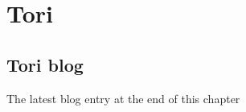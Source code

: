 
\chapter{Tori}
\label{c-tori}

%
%

\section{Tori blog}

\bigskip\bigskip
\noindent
{\color{red} The latest blog entry at the end of this chapter}
\bigskip\bigskip

